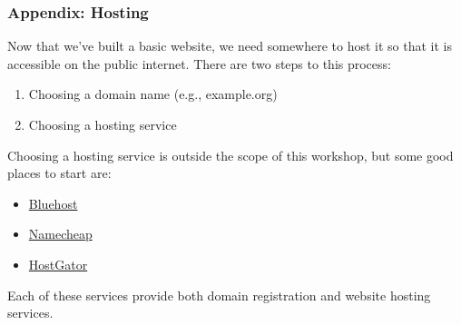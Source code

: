 \begin{frame}[fragile]
    \frametitle{Appendix: Hosting}

    Now that we've built a basic website, we need somewhere to host it so that it is accessible on the public internet.
    There are two steps to this process:

    \smallskip

    \begin{enumerate}
        \item Choosing a domain name (e.g., example.org)
        \item Choosing a hosting service
    \end{enumerate}

    \medskip
    Choosing a hosting service is outside the scope of this workshop, but some good places to start are:

    \smallskip

    \begin{itemize}
        \item \href{https://www.bluehost.com/}{Bluehost}
        \item \href{https://www.namecheap.com}{Namecheap}
        \item \href{https://www.hostgator.com/}{HostGator}
    \end{itemize}

    \vfill

    Each of these services provide both domain registration and website hosting services.
\end{frame}
